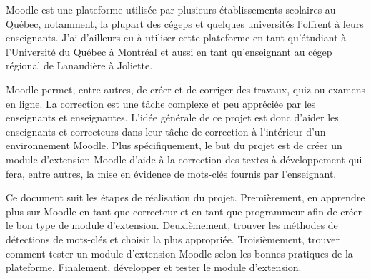 \begin{introduction}

Moodle est une plateforme utilisée par plusieurs établissements scolaires au Québec, notamment, la plupart des cégeps et quelques universités l'offrent à leurs enseignants.
J'ai d'ailleurs eu à utiliser cette plateforme en tant qu'étudiant à l'Université du Québec à Montréal et aussi en tant qu'enseignant au cégep régional de Lanaudière à Joliette.

Moodle permet, entre autres, de créer et de corriger des travaux, quiz ou examens en ligne.
La correction est une tâche complexe et peu appréciée par les enseignants et enseignantes.
L'idée générale de ce projet est donc d'aider les enseignants et correcteurs dans leur tâche de correction à l'intérieur d'un environnement Moodle.
Plus sp\'ecifiquement, le but du projet est de créer un module d'extension Moodle d'aide à la correction des textes à développement qui fera, entre autres, la mise en évidence de mots-clés fournis par l'enseignant.

Ce document suit les étapes de réalisation du projet.
Premièrement, en apprendre plus sur Moodle en tant que correcteur et en tant que programmeur afin de créer le bon type de module d'extension.
Deuxièmement, trouver les méthodes de détections de mots-clés et choisir la plus appropri\'ee.
Troisièmement, trouver comment tester un module d'extension Moodle selon les bonnes pratiques de la plateforme.
Finalement, développer et tester le module d'extension.

\end{introduction}
